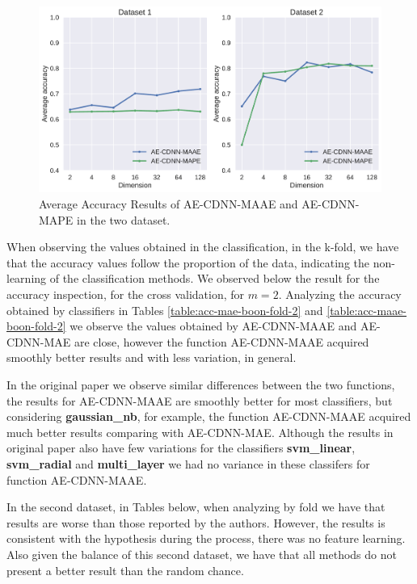 \begin{figure}[!ht]
\centering
\includegraphics[width=0.8\linewidth]{figure/average-MAAE-MAPE.pdf}
  \caption{Average Accuracy Results of AE-CDNN-MAAE and AE-CDNN-MAPE in the two dataset.}
\label{fig:average-maae-mape}
\end{figure}

When observing the values obtained in the classification, in the k-fold, we have that the accuracy values follow the proportion of the data, indicating the non-learning of the classification methods. We observed below the result for the accuracy inspection, for the cross validation, for $m = 2$. Analyzing the accuracy obtained by classifiers in Tables \ref{table:acc-mae-boon-fold-2} and \ref{table:acc-maae-boon-fold-2} we observe the values obtained by AE-CDNN-MAAE and AE-CDNN-MAE are close, however the function AE-CDNN-MAAE acquired smoothly better results and with less variation, in general. 





In the original paper we observe similar differences between the two functions, the results for AE-CDNN-MAAE are smoothly better for most classifiers, but considering \textbf{gaussian\_nb}, for example, the function AE-CDNN-MAAE acquired much better results comparing with AE-CDNN-MAE. Although the results in original paper also have few variations for the classifiers \textbf{svm\_linear}, \textbf{svm\_radial} and \textbf{multi\_layer} we had no variance in these classifers for function AE-CDNN-MAAE.

In the second dataset, in Tables below, when analyzing by fold we have that results are worse than those reported by the authors. However, the results is consistent with the hypothesis during the process, there was no feature learning. Also given the balance of this second dataset, we have that all methods do not present a better result than the random chance. 

